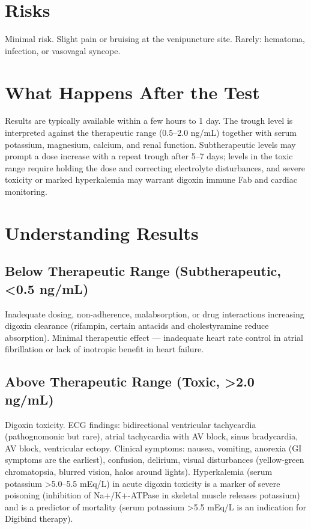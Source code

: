 \section*{Risks}
Minimal risk. Slight pain or bruising at the venipuncture site. Rarely: hematoma, infection, or vasovagal syncope.

\section*{What Happens After the Test}
Results are typically available within a few hours to 1 day. The trough level is interpreted against the therapeutic range (0.5--2.0 ng/mL) together with serum potassium, magnesium, calcium, and renal function. Subtherapeutic levels may prompt a dose increase with a repeat trough after 5--7 days; levels in the toxic range require holding the dose and correcting electrolyte disturbances, and severe toxicity or marked hyperkalemia may warrant digoxin immune Fab and cardiac monitoring.

\section*{Understanding Results}

\subsection*{Below Therapeutic Range (Subtherapeutic, <0.5 ng/mL)}
Inadequate dosing, non-adherence, malabsorption, or drug interactions increasing digoxin clearance (rifampin, certain antacids and cholestyramine reduce absorption). Minimal therapeutic effect --- inadequate heart rate control in atrial fibrillation or lack of inotropic benefit in heart failure.

\subsection*{Above Therapeutic Range (Toxic, >2.0 ng/mL)}
Digoxin toxicity. ECG findings: bidirectional ventricular tachycardia (pathognomonic but rare), atrial tachycardia with AV block, sinus bradycardia, AV block, ventricular ectopy. Clinical symptoms: nausea, vomiting, anorexia (GI symptoms are the earliest), confusion, delirium, visual disturbances (yellow-green chromatopsia, blurred vision, halos around lights). Hyperkalemia (serum potassium >5.0--5.5 mEq/L) in acute digoxin toxicity is a marker of severe poisoning (inhibition of Na+/K+-ATPase in skeletal muscle releases potassium) and is a predictor of mortality (serum potassium >5.5 mEq/L is an indication for Digibind therapy).

